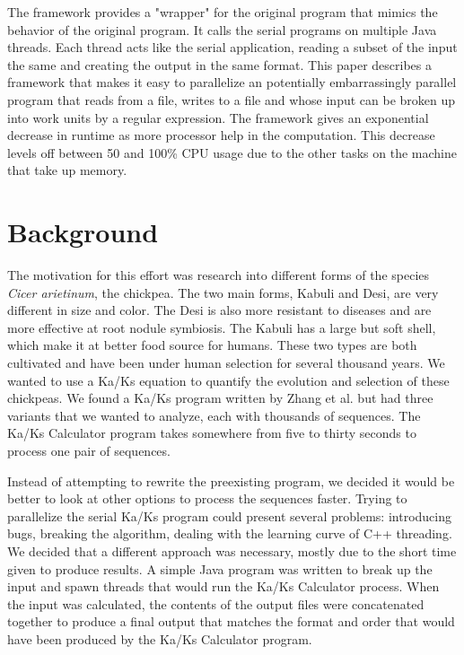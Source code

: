 \documentclass[12pt]{article}
\begin{document}
The framework provides a "wrapper" for the original program that mimics the
behavior of the original program. It calls the serial programs on multiple Java 
threads. Each thread acts like the serial application, reading a subset of the 
input the same and creating the output in the same format. This paper describes
a framework that makes it easy to parallelize an potentially embarrassingly
parallel program that reads from a file, writes to a file and whose input can be
broken up into work units by a regular expression. The framework gives an
exponential decrease in runtime as more processor help in the computation. This
decrease levels off between 50 and 100\% CPU usage due to the other tasks on the
machine that take up memory.

\section{Background}

The motivation for this effort was research into different forms of the 
species \emph{Cicer arietinum}, the chickpea. The two main forms, Kabuli and 
Desi, are very different in size and color. The Desi is also more resistant to 
diseases and are more effective at root nodule symbiosis. The Kabuli has a large 
but soft shell, which make it at better food source for humans. These two types 
are both cultivated and have been under human selection for several thousand 
years. We wanted to use a Ka/Ks equation to quantify the evolution and selection 
of these chickpeas. We found a Ka/Ks program written by Zhang et al. \cite{kaks}
but had three variants that we wanted to analyze, each with thousands of 
sequences. The Ka/Ks Calculator program takes somewhere from five to thirty 
seconds to process one pair of sequences. 

Instead of attempting to rewrite the preexisting program, we decided it would be
better to look at other options to process the sequences faster. Trying to 
parallelize the serial Ka/Ks program could present several problems: introducing
bugs, breaking the algorithm, dealing with the learning curve of C++ threading. 
We decided that a  different approach was necessary, mostly due to the short 
time given to produce results. A simple Java program was written to break up the
input and spawn threads that would run the Ka/Ks Calculator process. When the 
input was calculated, the contents of the output files were concatenated 
together to produce a final output that matches the format and order that would 
have been produced by the Ka/Ks Calculator program.
\end{document}
